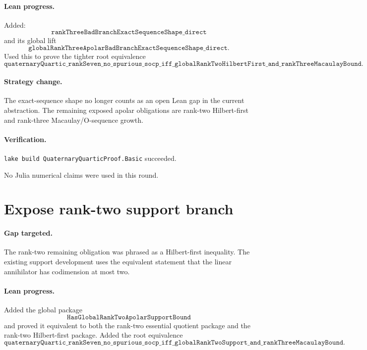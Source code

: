 \documentclass[11pt]{article}
\begin{document}
\paragraph{Lean progress.}
Added:
\[
\texttt{rankThreeBadBranchExactSequenceShape\_direct}
\]
and its global lift
\[
\texttt{globalRankThreeApolarBadBranchExactSequenceShape\_direct}.
\]
Used this to prove the tighter root equivalence
\[
\texttt{quaternaryQuartic\_rankSeven\_no\_spurious\_socp\_iff\_globalRankTwoHilbertFirst\_and\_rankThreeMacaulayBound}.
\]

\paragraph{Strategy change.}
The exact-sequence shape no longer counts as an open Lean gap in the current
abstraction.  The remaining exposed apolar obligations are rank-two
Hilbert-first and rank-three Macaulay/O-sequence growth.

\paragraph{Verification.}
\texttt{lake build QuaternaryQuarticProof.Basic} succeeded.

No Julia numerical claims were used in this round.

\section*{Expose rank-two support branch}

\paragraph{Gap targeted.}
The rank-two remaining obligation was phrased as a Hilbert-first inequality.
The existing support development uses the equivalent statement that the
linear annihilator has codimension at most two.

\paragraph{Lean progress.}
Added the global package
\[
\texttt{HasGlobalRankTwoApolarSupportBound}
\]
and proved it equivalent to both the rank-two essential quotient package and
the rank-two Hilbert-first package.  Added the root equivalence
\[
\texttt{quaternaryQuartic\_rankSeven\_no\_spurious\_socp\_iff\_globalRankTwoSupport\_and\_rankThreeMacaulayBound}.
\]
\end{document}
